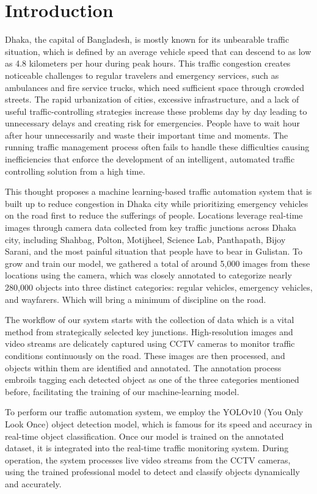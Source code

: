 \documentclass[usenatbib]{tjaa}
\begin{document}
\section[]{Introduction}
Dhaka, the capital of Bangladesh, is mostly known for its unbearable traffic situation, which is defined by an average vehicle speed that can descend to as low as 4.8 kilometers per hour during peak hours. This traffic congestion creates noticeable challenges to regular travelers and emergency services, such as ambulances and fire service trucks, which need sufficient space through crowded streets. The rapid urbanization of cities, excessive infrastructure, and a lack of useful traffic-controlling strategies increase these problems day by day leading to unnecessary delays and creating risk for emergencies. People have to wait hour after hour unnecessarily and waste their important time and moments. The running traffic management process often fails to handle these difficulties causing inefficiencies that enforce the development of an intelligent, automated traffic controlling solution from a high time. 


This thought proposes a machine learning-based traffic automation system that is built up to reduce congestion in Dhaka city while prioritizing emergency vehicles on the road first to reduce the sufferings of people. Locations leverage real-time images through camera data collected from key traffic junctions across Dhaka city, including Shahbag, Polton, Motijheel, Science Lab, Panthapath, Bijoy Sarani, and the most painful situation that people have to bear in Gulistan. To grow and train our model, we gathered a total of around 5,000 images from these locations using the camera, which was closely annotated to categorize nearly 280,000 objects into three distinct categories: regular vehicles, emergency vehicles, and wayfarers. Which will bring a minimum of discipline on the road. 


The workflow of our system starts with the collection of data which is a vital method from strategically selected key junctions. High-resolution images and video streams are delicately captured using CCTV cameras to monitor traffic conditions continuously on the road. These images are then processed, and objects within them are identified and annotated. The annotation process embroils tagging each detected object as one of the three categories mentioned before, facilitating the training of our machine-learning model. 


To perform our traffic automation system, we employ the YOLOv10 (You Only Look Once) object detection model, which is famous for its speed and accuracy in real-time object classification. Once our model is trained on the annotated dataset, it is integrated into the real-time traffic monitoring system. During operation, the system processes live video streams from the CCTV cameras, using the trained professional model to detect and classify objects dynamically and accurately. 
\end{document}
